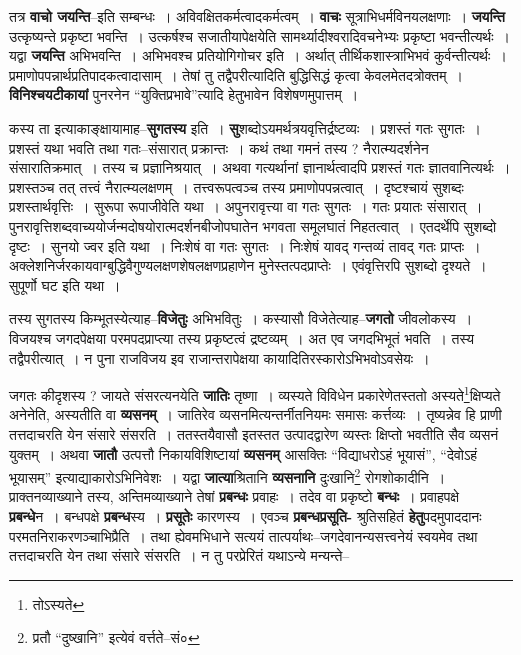 \documentclass[article,12pt,a4paper]{memoir}
\begin{document}
	  \pstart तत्र \textbf{वाचो जयन्ति}--इति सम्बन्धः । अविवक्षितकर्मत्वादकर्मत्वम् । \textbf{वाचः} सूत्राभिधर्मविनयलक्षणाः । \textbf{जयन्ति} उत्कृष्यन्ते प्रकृष्टा भवन्ति । उत्कर्षश्च सजातीयापेक्षयेति सामर्थ्यादीश्वरादिवचनेभ्यः प्रकृष्टा भवन्तीत्यर्थः । यद्वा \textbf{जयन्ति} अभिभवन्ति । अभिभवश्च प्रतियोगिगोचर इति । अर्थात् तीर्थिकशास्त्राभिभवं कुर्वन्तीत्यर्थः । प्रमाणोपपन्नार्थप्रतिपादकत्वादासाम् । तेषां तु तद्वैपरीत्यादिति बुद्धिसिद्धं कृत्वा केवलमेतदत्रोक्तम् । \textbf{विनिश्चयटीकायां} पुनरनेन “युक्तिप्रभावे”त्यादि हेतुभावेन विशेषणमुपात्तम् ।
	\pend
      

	  \pstart कस्य ता इत्याकाङ्क्षायामाह--\textbf{सुगतस्य} इति । \textbf{सु}शब्दोऽयमर्थत्रयवृत्तिर्द्रष्टव्यः । प्रशस्तं गतः सुगतः । प्रशस्तं यथा भवति तथा गतः--संसारात् प्रक्रान्तः । कथं तथा गमनं तस्य ? नैरात्म्यदर्शनेन संसारातिक्रमात् । तस्य च प्रज्ञानिश्रयात् । अथवा गत्यर्थानां ज्ञानार्थत्वादपि प्रशस्तं गतः ज्ञातवानित्यर्थः । प्रशस्तञ्च तत् तत्त्वं नैरात्म्यलक्षणम् । तत्त्वरूपत्वञ्च तस्य प्रमाणोपपन्नत्वात् । दृष्टश्चायं सुशब्दः प्रशस्तार्थवृत्तिः । सुरूपा रूपाजीवेति यथा । अपुनरावृत्त्या वा गतः सुगतः । गतः प्रयातः संसारात् । पुनरावृत्तिशब्दवाच्ययोर्जन्मदोषयोरात्मदर्शनबीजोपघातेन भगवता समूलघातं निहतत्वात् । एतदर्थेपि सुशब्दो दृष्टः । सुनयो ज्वर इति यथा । निःशेषं वा गतः सुगतः । निःशेषं यावद् गन्तव्यं तावद् गतः प्राप्तः । अक्लेशनिर्जरकायवाग्बुद्धिवैगुण्यलक्षणशेषलक्षणप्रहाणेन मुनेस्तत्पदप्राप्तेः । एवंवृत्तिरपि सुशब्दो दृश्यते । सुपूर्णो घट इति यथा ।
	\pend
      

	  \pstart तस्य सु\leavevmode{}गतस्य किम्भूतस्येत्याह--\textbf{विजेतुः} अभिभवितुः । कस्यासौ विजेतेत्याह--\textbf{जगतो} जीवलोकस्य । विजयश्च जगदपेक्षया परमपदप्राप्त्या तस्य प्रकृष्टत्वं द्रष्टव्यम् । अत एव जगदभिभूतं भवति । तस्य तद्वैपरीत्यात् । न पुना राजविजय इव राजान्तरापेक्षया कायादितिरस्कारोऽभिभवोऽवसेयः ।
	\pend
      

	  \pstart जगतः कीदृशस्य ? जायते संसरत्यनयेति \textbf{जातिः} तृष्णा । व्यस्यते विविधेन प्रकारेणेतस्ततो अस्यते\footnote{तोऽस्यते}\-क्षिप्यते अनेनेति, अस्यतीति वा \textbf{व्यसनम्} । जातिरेव व्यसनमित्यन्तर्नीतनियमः समासः कर्त्तव्यः । तृष्यन्नेव हि प्राणी तत्तदाचरति येन संसारे संसरति । ततस्तयैवासौ इतस्तत उत्पादद्वारेण व्यस्तः क्षिप्तो भवतीति सैव व्यसनं युक्तम् । अथवा \textbf{जातौ} उत्पत्तौ निकायविशिष्टायां \textbf{व्यसनम्} आसक्तिः “विद्याधरोऽहं भूयासं”, “देवोऽहं भूयासम्” इत्याद्याकारोऽभिनिवेशः । यद्वा \textbf{जात्या}श्रितानि \textbf{व्यसनानि} दुःखानि\footnote{प्रतौ “दुष्खानि” इत्येवं वर्त्तते--सं०} रोगशोकादीनि । प्राक्तनव्याख्याने तस्य, अन्तिमव्याख्याने तेषां \textbf{प्रबन्धः} प्रवाहः । तदेव वा प्रकृष्टो \textbf{बन्धः} । प्रवाहपक्षे \textbf{प्रबन्धे}न । बन्धपक्षे \textbf{प्रबन्ध}स्य । \textbf{प्रसूतेः} कारणस्य । एवञ्च \textbf{प्रबन्धप्रसूति-} श्रुतिसहितं \textbf{हेतु}पदमुपाददानः परमतनिराकरणञ्चाभिप्रैति । तथा ह्येवमभिधाने सत्ययं \leavevmode{} तात्पर्याथः--जगदेवानन्यसत्त्वनेयं स्वयमेव तथा तत्तदाचरति येन तथा संसारे संसरति । न तु परप्रेरितं यथाऽन्ये मन्यन्ते--
	\pend
      
\end{document}
